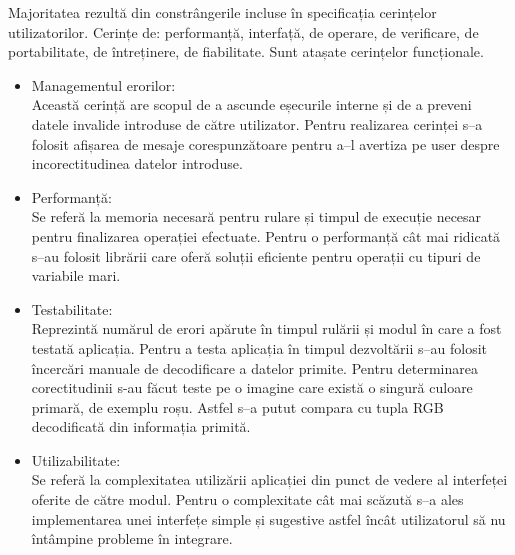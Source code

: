 Majoritatea rezultă din constrângerile incluse în specificația cerințelor utilizatorilor. Cerințe de: performanță, interfață, de operare, de verificare, de portabilitate, de întreținere, de fiabilitate. Sunt atașate cerințelor funcționale.
\begin{itemize}
  \item Managementul erorilor:\\
Această cerință are scopul de a ascunde eșecurile interne și de a preveni datele invalide introduse de către utilizator. Pentru realizarea cerinței s–a folosit afișarea de mesaje corespunzătoare pentru a–l avertiza pe user despre incorectitudinea datelor introduse.

  \item Performanță:\\
Se referă la memoria necesară pentru rulare și timpul de execuție necesar pentru finalizarea operației efectuate. Pentru o performanță cât mai ridicată s–au folosit librării care oferă soluții eficiente pentru operații cu tipuri de variabile mari.

  \item Testabilitate:\\
Reprezintă numărul de erori apărute în timpul rulării și modul în care a fost testată aplicația.
Pentru a testa aplicația în timpul dezvoltării s–au folosit încercări manuale de decodificare a datelor primite. Pentru determinarea corectitudinii s-au făcut teste pe o imagine care există o singură culoare primară, de exemplu roșu. Astfel s–a putut compara cu tupla RGB decodificată din informația primită.

  \item Utilizabilitate:\\
Se referă la complexitatea utilizării aplicației din punct de vedere al interfeței  oferite de către modul.
Pentru o complexitate cât mai scăzută s–a ales implementarea unei interfețe simple și sugestive astfel încât utilizatorul să nu întâmpine probleme în integrare.
\end{itemize}